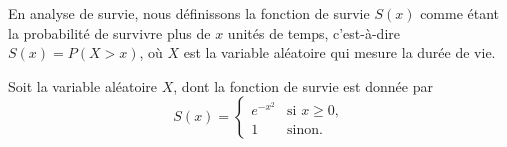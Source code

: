 \begin{questions}
\begin{parts}
\end{parts}                                                      

\newpage

\question En analyse de survie, nous définissons la fonction de survie $S(x)$ comme étant la probabilité de survivre plus de $x$ unités de temps, c'est-à-dire $S(x)=P(X>x)$, où $X$ est la variable aléatoire qui mesure la durée de vie. 

\vspace{0.5cm}
 Soit la variable aléatoire $X$, dont la fonction de survie est donnée par 
\[ S(x) =
\begin{cases}
   \displaystyle e^{-x^2}& \text{si } x \ge 0, \\
    1 & \text{sinon}.
\end{cases}
\]

\end{questions}
